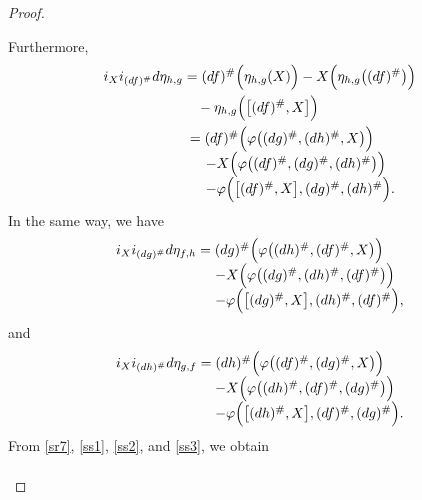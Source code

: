 \documentclass[a4paper,10pt]{article}
\numberwithin{equation}{section}
\theoremstyle{plain}
\begin{document}
\begin{proof}
\begin{itemize}
				Furthermore,
				\begin{align}
						i_{X}i_{(df)^{\#}}d\eta_{h,g}\nonumber &=(df)^{\#}\Big(\eta_{h,g}(X)\Big)-X\Big(\eta_{h,g}\big((df)^{\#}\big)\Big)\\\nonumber
						&\quad-
						\eta_{h,g}\Big(\big[(df)^{\#},X\big]\Big)\\
						&\begin{array}{l}=(df)^{\#}\Big(\varphi\big((dg)^{\#},(dh)^{\#},X\big)\Big)\\
							\hspace{0.4cm}-
							 X\Big(\varphi\big((df)^{\#},(dg)^{\#},(dh)^{\#}\big)\Big)\\\hspace{0.4cm}-\varphi\Big(\big[(df)^{\#},X\big],(dg)^{\#},(dh)^{\#}\Big).
						\end{array}\label{ss1}	
					\end{align}
					In the same way, we have
					\begin{align}\label{ss2}
						\begin{array}{l}i_{X}i_{(dg)^{\#}}d\eta_{f,h}= (dg)^{\#}\Big(\varphi\big((dh)^{\#},(df)^{\#},X\big)\Big)\\
							\hspace{2.5cm}-
							X\Big(\varphi\big((dg)^{\#},(dh)^{\#},(df)^{\#}\big)\Big)\\
							\hspace{2.5cm}
							-\varphi\Big(\big[(dg)^{\#},X\big],(dh)^{\#},(df)^{\#}\Big),
						\end{array}
					\end{align}
					and
					\begin{align}\label{ss3}
						\begin{array}{l}i_{X}i_{(dh)^{\#}}d\eta_{g,f}=(dh)^{\#}\Big(\varphi\big((df)^{\#},(dg)^{\#},X\big)\Big)\\
							\hspace{2.5cm}-
							X\Big(\varphi\big((dh)^{\#},(df)^{\#},(dg)^{\#}\big)\Big)\\
							\hspace{2.5cm}-\varphi\Big(\big[(dh)^{\#},X\big],(df)^{\#},(dg)^{\#}\Big).
						\end{array}
					\end{align}
					From \eqref{sr7},   \eqref{ss1}, \eqref{ss2},  and  \eqref{ss3}, we obtain
					\begin{align*}

\end{align*}
\end{itemize}
\end{proof}
\end{document}
